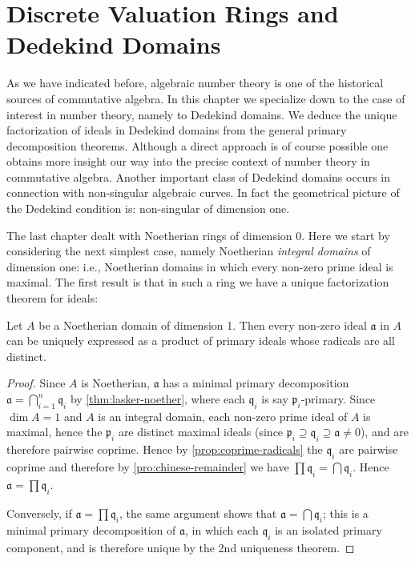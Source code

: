 \chapter{Discrete Valuation Rings and Dedekind Domains}\label{ch:dvr-dedekind}

As we have indicated before, algebraic number theory is one of the historical sources of commutative algebra. In this chapter we specialize down to the case of interest in number theory, namely to Dedekind domains. We deduce the unique factorization of ideals in Dedekind domains from the general primary decomposition theorems. Although a direct approach is of course possible one obtains more insight our way into the precise context of number theory in commutative algebra. Another important class of Dedekind domains occurs in connection with non-singular algebraic curves. In fact the geometrical picture of the Dedekind condition is: non-singular of dimension one.

The last chapter dealt with Noetherian rings of dimension 0. Here we start by considering the next simplest case, namely Noetherian \textit{integral domains} of dimension one: i.e., Noetherian domains in which every non-zero prime ideal is maximal. The first result is that in such a ring we have a unique factorization theorem for ideals:

\begin{proposition}\label{prop:unique-factorization-dim1}
Let $A$ be a Noetherian domain of dimension 1. Then every non-zero ideal $\mathfrak{a}$ in $A$ can be uniquely expressed as a product of primary ideals whose radicals are all distinct.
\end{proposition}

\begin{proof}
Since $A$ is Noetherian, $\mathfrak{a}$ has a minimal primary decomposition $\mathfrak{a} = \bigcap_{i=1}^{n} \mathfrak{q}_i$ by \eqref{thm:lasker-noether}, where each $\mathfrak{q}_i$ is say $\mathfrak{p}_i$-primary. Since $\dim A = 1$ and $A$ is an integral domain, each non-zero prime ideal of $A$ is maximal, hence the $\mathfrak{p}_i$ are distinct maximal ideals (since $\mathfrak{p}_i \supseteq \mathfrak{q}_i \supseteq \mathfrak{a} \neq 0$), and are therefore pairwise coprime. Hence by \eqref{prop:coprime-radicals} the $\mathfrak{q}_i$ are pairwise coprime and therefore by \eqref{pro:chinese-remainder} we have $\prod \mathfrak{q}_i = \bigcap \mathfrak{q}_i$. Hence $\mathfrak{a} = \prod \mathfrak{q}_i$.

Conversely, if $\mathfrak{a} = \prod \mathfrak{q}_i$, the same argument shows that $\mathfrak{a} = \bigcap \mathfrak{q}_i$; this is a minimal primary decomposition of $\mathfrak{a}$, in which each $\mathfrak{q}_i$ is an isolated primary component, and is therefore unique by the 2nd uniqueness theorem.
\end{proof}

